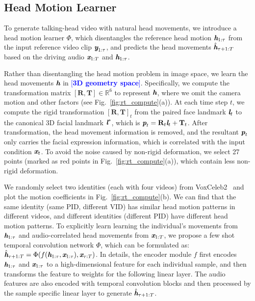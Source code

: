 \documentclass[runningheads]{llncs}
\def\mathbi#1{\textbf{\em #1}}
\providecommand{\lchen}[1]{\textcolor{blue}{[{\bf #1}]}}
\begin{document}
\subsection{Head Motion Learner}
\label{subsec:head_mo}
To generate talking-head video with natural head movements, we introduce a head motion learner $\Phi$, which disentangles the reference head motion ${\mathbi{h}}_{1:\tau}$ from the input reference video clip $\mathbi{y}_{1:\tau}$, and predicts the head movements $\hat{\mathbi{h}}_{\tau +1:T}$ based on the driving audio ${\mathbi{x}}_{1:T}$ and ${\mathbi{h}}_{1:\tau}$.

 \indent Rather than disentangling the head motion problem in image space, we learn the head movements $\mathbi{h}$ in \lchen{3D geometry space}. Specifically, we compute the transformation matrix $[\mathbf{R},\mathbf{T}] \in \mathbb{R}^{6}$ to represent $\mathbi{h}$, where we omit the camera motion and other factors (see Fig.~\ref{fig:rt_compute}(a)). At each time step $t$, we compute the rigid transformation $[\mathbf{R},\mathbf{T}]_t$ from the paired face landmark $\mathbi{l}_t$ to the canonical 3D facial landmark $\mathbi{l}^*$, which is ${\mathbi{p}}_t = \mathbf{R}_t  \mathbi{l}_t + \mathbf{T}_t$. After transformation, the head movement information is removed, and the resultant ${\mathbi{p}}_t$ only carries the facial expression information, which is correlated with the input condition $\mathbi{x}_t$. To avoid the noise caused by non-rigid deformation, we select 27 points (marked as red points in Fig.~\ref{fig:rt_compute}(a)), which contain less non-rigid deformation.
 
 \indent We randomly select two identities (each with four videos) from VoxCeleb2~\cite{Chung18b} and plot the motion coefficients in Fig.~\ref{fig:rt_compute}(b). We can find that the same identity (same PID, different VID) has similar head motion patterns in different videos, and different identities (different PID) have different head motion patterns. To explicitly learn learning the individual's movements from ${\mathbi{h}}_{1:\tau}$ and audio-correlated head movements from ${{\mathbi{x}}}_{1:T}$, we propose a few shot temporal convolution network $\Phi$, which can be formulated as: ${\hat{\mathbi{h}}}_{\tau+1:T} = \Phi( f({{\mathbi{h}}}_{1:\tau}, {{\mathbi{x}}}_{1:\tau}), {{\mathbi{x}}}_{\tau:T})$. In details, the encoder module $f$ first encodes ${\mathbi{h}}_{1:\tau}$ and ${{\mathbi{x}}}_{1:\tau}$ to a high-dimensional feature for each individual sample, and then transforms the feature to weights for the following linear layer. The audio features are also encoded with temporal convolution blocks and then processed by the sample specific linear layer to generate ${\hat{\mathbi{h}}}_{\tau+1:T}$.
 
\end{document}
